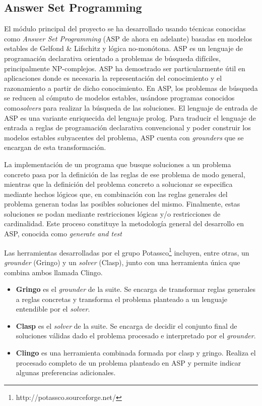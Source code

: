 \subsection{Answer Set Programming}
\label{subsec:asp}
El módulo principal del proyecto se ha desarrollado usando técnicas conocidas como \textit{Answer Set Programming}\cite{Brewka:2011:ASP:2043174.2043195} (ASP de ahora en adelante) basadas en modelos estables de Gelfond \& Lifschitz\cite{Gelfond88thestable} y lógica no-monótona. ASP es un lenguaje de programación declarativa orientado a problemas de búsqueda difíciles, principalmente NP-complejos. ASP ha demostrado ser particularmente útil en aplicaciones donde es necesaria la representación del conocimiento y el razonamiento a partir de dicho conocimiento. En ASP, los problemas de búsqueda se reducen al cómputo de modelos estables, usándose programas conocidos como\textit{solvers} para realizar la búsqueda de las soluciones. El lenguaje de entrada de ASP es una variante enriquecida del lenguaje prolog. Para traducir el lenguaje de entrada a reglas de programación declarativa convencional y poder construir los modelos estables subyacentes del problema, ASP cuenta con \textit{grounders} que se encargan de esta transformación.

La implementación de un programa que busque soluciones a un problema concreto pasa por la definición de las reglas de ese problema de modo general, mientras que la definición del problema concreto a solucionar se especifica mediante hechos lógicos que, en combinación con las reglas generales del problema generan todas las posibles soluciones del mismo. Finalmente, estas soluciones se podan mediante restricciones lógicas y/o restricciones de cardinalidad. Este proceso constituye la metodología general del desarrollo en ASP, conocida como \textit{generate and test}

Las herramientas desarrolladas por el grupo Potassco\footnote{http://potassco.sourceforge.net/} incluyen, entre otras, un \textit{grounder} (Gringo) y un \textit{solver} (Clasp), junto con una herramienta única que combina ambos llamada Clingo.

\begin{itemize}
 \item \textbf{Gringo} es el \textit{grounder} de la suite. Se encarga de transformar reglas generales a reglas concretas y transforma el problema planteado a un lenguaje entendible por el \textit{solver}.
 \item \textbf{Clasp} es el \textit{solver} de la suite. Se encarga de decidir el conjunto final de soluciones válidas dado el problema procesado e interpretado por el \textit{grounder}.
 \item \textbf{Clingo} es una herramienta combinada formada por clasp y gringo. Realiza el procesado completo de un problema planteado en ASP y permite indicar algunas preferencias adicionales.
\end{itemize}

